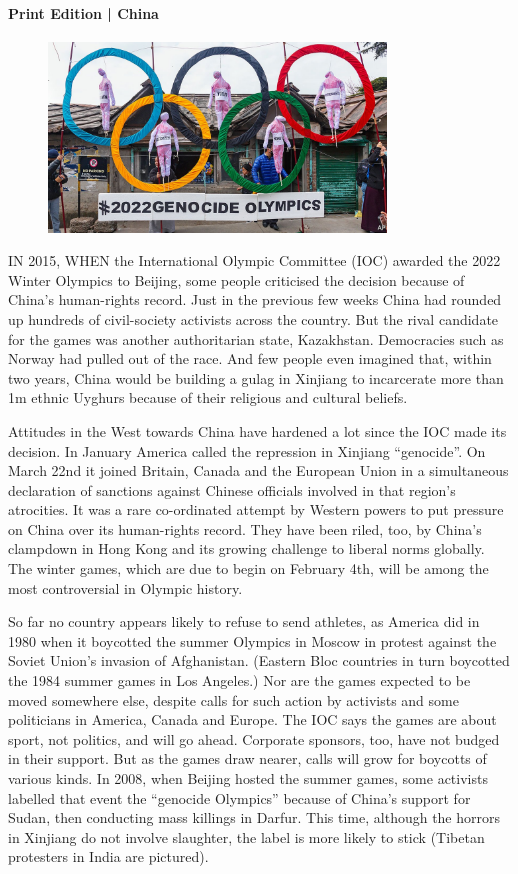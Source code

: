 \documentclass{article}
\begin{document}
\paragraph{Print Edition | China  \quad \color{gray}{Mar 27th 2021 }}
\begin{figure}[h]
\centering
\includegraphics[width=0.8\textwidth]{images/20210327_CNP001_0.jpg}
\end{figure}
\lettrine{I}N 2015, WHEN the International Olympic Committee (IOC) awarded the 2022 Winter Olympics to Beijing, some people criticised the decision because of China's human-rights record. Just in the previous few weeks China had rounded up hundreds of civil-society activists across the country. But the rival candidate for the games was another authoritarian state, Kazakhstan. Democracies such as Norway had pulled out of the race. And few people even imagined that, within two years, China would be building a gulag in Xinjiang to incarcerate more than 1m ethnic Uyghurs because of their religious and cultural beliefs. 

Attitudes in the West towards China have hardened a lot since the IOC made its decision. In January America called the repression in Xinjiang ``genocide''. On March 22nd it joined Britain, Canada and the European Union in a simultaneous declaration of sanctions against Chinese officials involved in that region's atrocities. It was a rare co-ordinated attempt by Western powers to put pressure on China over its human-rights record. They have been riled, too, by China's clampdown in Hong Kong and its growing challenge to liberal norms globally. The winter games, which are due to begin on February 4th, will be among the most controversial in Olympic history. 

So far no country appears likely to refuse to send athletes, as America did in 1980 when it boycotted the summer Olympics in Moscow in protest against the Soviet Union's invasion of Afghanistan. (Eastern Bloc countries in turn boycotted the 1984 summer games in Los Angeles.) Nor are the games expected to be moved somewhere else, despite calls for such action by activists and some politicians in America, Canada and Europe. The IOC says the games are about sport, not politics, and will go ahead. Corporate sponsors, too, have not budged in their support. But as the games draw nearer, calls will grow for boycotts of various kinds. In 2008, when Beijing hosted the summer games, some activists labelled that event the ``genocide Olympics'' because of China's support for Sudan, then conducting mass killings in Darfur. This time, although the horrors in Xinjiang do not involve slaughter, the label is more likely to stick (Tibetan protesters in India are pictured). 
\end{document}
